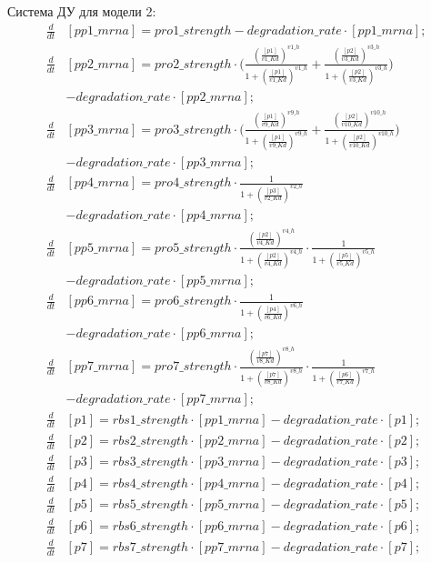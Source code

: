 Система ДУ для модели 2:
\[ \begin{aligned}
  \frac{d}{dt}&[pp1\_mrna] = pro1\_strength - degradation\_rate \cdot [pp1\_mrna]; \\
  \frac{d}{dt}&[pp2\_mrna] = pro2\_strength 
    \cdot \biggl(\frac{(\frac{[p1]}{v1\_Kd})^{v1\_h}}{1+(\frac{[p1]}{v1\_Kd})^{v1\_h}} + 
    \frac{(\frac{[p2]}{v3\_Kd})^{v3\_h}}{1+(\frac{[p2]}{v3\_Kd})^{v3\_h}}\biggr) \\ 
    & - degradation\_rate \cdot [pp2\_mrna]; \\
  \frac{d}{dt}&[pp3\_mrna] = pro3\_strength 
    \cdot \biggl(\frac{(\frac{[p1]}{v9\_Kd})^{v9\_h}}{1+(\frac{[p1]}{v9\_Kd})^{v9\_h}} + 
    \frac{(\frac{[p2]}{v10\_Kd})^{v10\_h}}{1+(\frac{[p2]}{v10\_Kd})^{v10\_h}}\biggr) \\
    & - degradation\_rate \cdot [pp3\_mrna]; \\
  \frac{d}{dt}&[pp4\_mrna] = pro4\_strength 
    \cdot \frac{1}{1+(\frac{[p3]}{v2\_Kd})^{v2\_h}} \\
    & - degradation\_rate \cdot [pp4\_mrna]; \\
  \frac{d}{dt}&[pp5\_mrna] = pro5\_strength 
    \cdot \frac{(\frac{[p2]}{v4\_Kd })^{v4\_h }}{1+(\frac{[p2]}{v4\_Kd })^{v4\_h }} 
    \cdot \frac{1}{1+(\frac{[p5]}{v5\_Kd})^{v5\_h}} \\
    & - degradation\_rate \cdot [pp5\_mrna]; \\
  \frac{d}{dt}&[pp6\_mrna] = pro6\_strength 
    \cdot \frac{1}{1+(\frac{[p4]}{v6\_Kd})^{v6\_h}} \\
    & - degradation\_rate \cdot [pp6\_mrna]; \\
  \frac{d}{dt}&[pp7\_mrna] = pro7\_strength 
    \cdot \frac{(\frac{[p7]}{v8\_Kd })^{v8\_h }}{1+(\frac{[p7]}{v8\_Kd })^{v8\_h }} 
    \cdot \frac{1}{1+(\frac{[p6]}{v7\_Kd})^{v7\_h}} \\ 
    & - degradation\_rate \cdot [pp7\_mrna]; \\
  \frac{d}{dt}&[p1] = rbs1\_strength \cdot [pp1\_mrna] - degradation\_rate \cdot [p1]; \\
  \frac{d}{dt}&[p2] = rbs2\_strength \cdot [pp2\_mrna] - degradation\_rate \cdot [p2]; \\
  \frac{d}{dt}&[p3] = rbs3\_strength \cdot [pp3\_mrna] - degradation\_rate \cdot [p3]; \\
  \frac{d}{dt}&[p4] = rbs4\_strength \cdot [pp4\_mrna] - degradation\_rate \cdot [p4]; \\
  \frac{d}{dt}&[p5] = rbs5\_strength \cdot [pp5\_mrna] - degradation\_rate \cdot [p5]; \\
  \frac{d}{dt}&[p6] = rbs6\_strength \cdot [pp6\_mrna] - degradation\_rate \cdot [p6]; \\
  \frac{d}{dt}&[p7] = rbs7\_strength \cdot [pp7\_mrna] - degradation\_rate \cdot [p7]; \\
\end{aligned} \]

